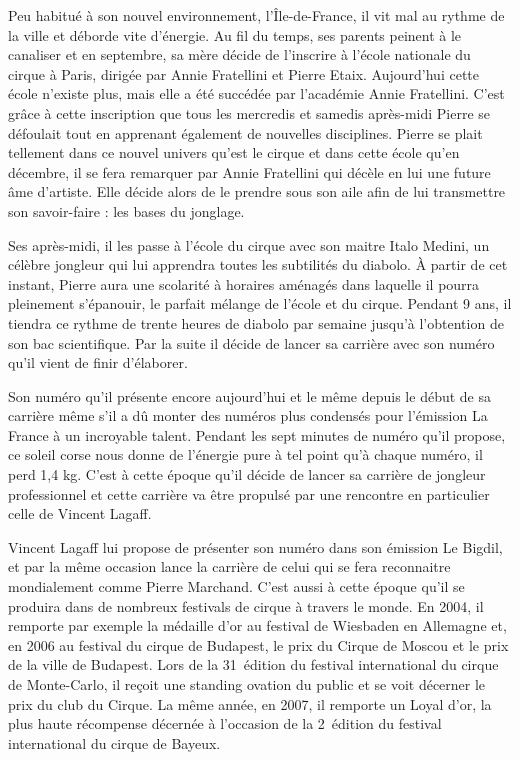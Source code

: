 Peu habitué à son nouvel environnement, l'Île-de-France, il vit mal au rythme de la ville et déborde vite d'énergie. Au fil du temps, ses parents peinent à le canaliser et en septembre, sa mère décide de l'inscrire à l'école nationale du cirque à Paris, dirigée par Annie Fratellini et Pierre Etaix. Aujourd'hui cette école n'existe plus, mais elle a été succédée par l'académie Annie Fratellini. C'est grâce à cette inscription que tous les mercredis et samedis après-midi Pierre se défoulait tout en apprenant également de nouvelles disciplines. Pierre se plait tellement dans ce nouvel univers qu'est le cirque et dans cette école qu'en décembre, il se fera remarquer par Annie Fratellini qui décèle en lui une future âme d'artiste. Elle décide alors de le prendre sous son aile afin de lui transmettre son savoir-faire : les bases du jonglage.

Ses après-midi, il les passe à l'école du cirque avec son maitre Italo Medini, un célèbre jongleur qui lui apprendra toutes les subtilités du diabolo. À partir de cet instant, Pierre aura une scolarité à horaires aménagés dans laquelle il pourra pleinement s'épanouir, le parfait mélange de l'école et du cirque. Pendant 9 ans, il tiendra ce rythme de trente heures de diabolo par semaine jusqu'à l'obtention de son bac scientifique. Par la suite il décide de lancer sa carrière avec son numéro qu’il vient de finir d'élaborer.

Son numéro qu'il présente encore aujourd'hui et le même depuis le début de sa carrière même s'il a dû monter des numéros plus condensés pour l'émission La France à un incroyable talent. Pendant les sept minutes de numéro qu'il propose, ce soleil corse nous donne de l'énergie pure à tel point qu'à chaque numéro, il perd 1,4 kg. C'est à cette époque qu'il décide de lancer sa carrière de jongleur professionnel et cette carrière va être propulsé par une rencontre en particulier celle de Vincent Lagaff.

Vincent Lagaff lui propose de présenter son numéro dans son émission Le Bigdil, et par la même occasion lance la carrière de celui qui se fera reconnaitre mondialement comme Pierre Marchand. C'est aussi à cette époque qu'il se produira dans de nombreux festivals de cirque à travers le monde. En 2004, il remporte par exemple la médaille d'or au festival de Wiesbaden en Allemagne et, en 2006 au festival du cirque de Budapest, le prix du Cirque de Moscou et le prix de la ville de Budapest. Lors de la 31\ieme~édition du festival international du cirque de Monte-Carlo, il reçoit une standing ovation du public et se voit décerner le prix du club du Cirque. La même année, en 2007, il remporte un Loyal d'or, la plus haute récompense décernée à l'occasion de la 2\ieme~édition du festival international du cirque de Bayeux.

